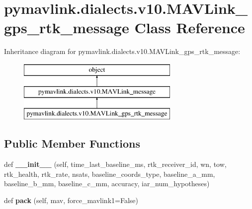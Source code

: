 \hypertarget{classpymavlink_1_1dialects_1_1v10_1_1MAVLink__gps__rtk__message}{}\section{pymavlink.\+dialects.\+v10.\+M\+A\+V\+Link\+\_\+gps\+\_\+rtk\+\_\+message Class Reference}
\label{classpymavlink_1_1dialects_1_1v10_1_1MAVLink__gps__rtk__message}
Inheritance diagram for pymavlink.\+dialects.\+v10.\+M\+A\+V\+Link\+\_\+gps\+\_\+rtk\+\_\+message\+:\begin{figure}[H]
\begin{center}
\leavevmode
\includegraphics[height=3.000000cm]{classpymavlink_1_1dialects_1_1v10_1_1MAVLink__gps__rtk__message}
\end{center}
\end{figure}
\subsection*{Public Member Functions}
\begin{DoxyCompactItemize}
\item 
\mbox{\label{classpymavlink_1_1dialects_1_1v10_1_1MAVLink__gps__rtk__message_a12b6af9e777cf61d7b63b869e9379b49}} 
def {\bfseries \+\_\+\+\_\+init\+\_\+\+\_\+} (self, time\+\_\+last\+\_\+baseline\+\_\+ms, rtk\+\_\+receiver\+\_\+id, wn, tow, rtk\+\_\+health, rtk\+\_\+rate, nsats, baseline\+\_\+coords\+\_\+type, baseline\+\_\+a\+\_\+mm, baseline\+\_\+b\+\_\+mm, baseline\+\_\+c\+\_\+mm, accuracy, iar\+\_\+num\+\_\+hypotheses)
\item 
\mbox{\label{classpymavlink_1_1dialects_1_1v10_1_1MAVLink__gps__rtk__message_a4d70a0f9f05c1ebe77ba06ee7f599ce5}} 
def {\bfseries pack} (self, mav, force\+\_\+mavlink1=False)
\end{DoxyCompactItemize}
